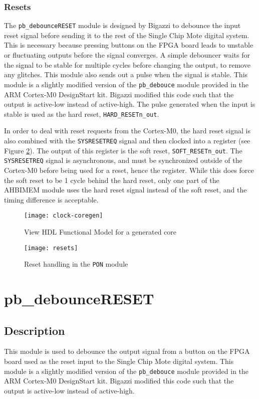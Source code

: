 \subsubsection{Resets}
The \texttt{pb\_debounceRESET} module is designed by Bigazzi to debounce the input reset signal before sending it to the rest of the Single Chip Mote digital system. This is necessary because pressing buttons on the FPGA board leads to unstable or fluctuating outputs before the signal converges. A simple debouncer waits for the signal to be stable for multiple cycles before changing the output, to remove any glitches. This module also sends out a pulse when the signal is stable. This module is a slightly modified version of the \texttt{pb\_debouce} module provided in the ARM Cortex-M0 DesignStart kit. Bigazzi modified this code such that the output is active-low instead of active-high. The pulse generated when the input is stable is used as the hard reset, \texttt{HARD\_RESETn\_out}.

In order to deal with reset requests from the Cortex-M0, the hard reset signal is also combined with the \texttt{SYSRESETREQ} signal and then clocked into a register (see Figure \ref{fig:resets}). The output of this register is the soft reset, \texttt{SOFT\_RESETn\_out}. The \texttt{SYSRESETREQ} signal is asynchronous, and must be synchronized outside of the Cortex-M0 before being used for a reset, hence the register. While this does force the soft reset to be 1 cycle behind the hard reset, only one part of the AHBIMEM module uses the hard reset signal instead of the soft reset, and the timing difference is acceptable.

\begin{figure}
\centering
\texttt{[image: clock-coregen]}
\caption{View HDL Functional Model for a generated core}
\label{fig:clock-coregen}
\end{figure}
\begin{figure}
	\centering
	\texttt{[image: resets]}
	\caption{Reset handling in the \texttt{PON} module}
	\label{fig:resets}
\end{figure}

\section{pb\_debounceRESET}
\subsection{Description}
This module is used to debounce the output signal from a button on the FPGA board used as the reset input to the Single Chip Mote digital system. This module is a slightly modified version of the \texttt{pb\_debouce} module provided in the ARM Cortex-M0 DesignStart kit. Bigazzi modified this code such that the output is active-low instead of active-high.

